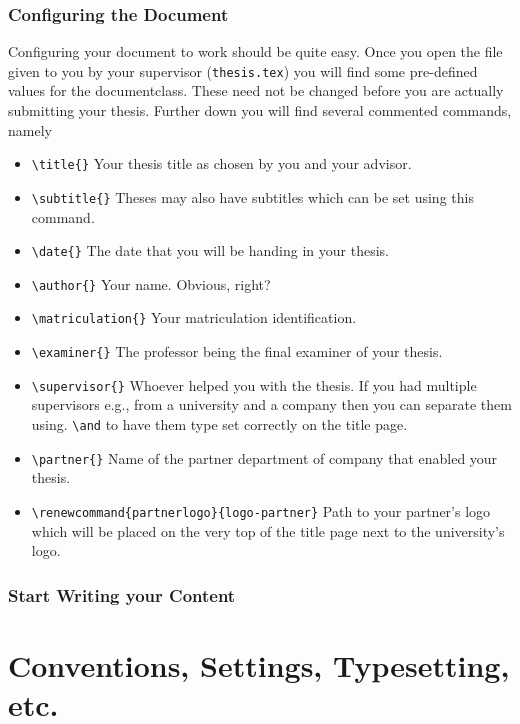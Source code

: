 \subsubsection{Configuring the Document}\label{sec:user-documentation:configure-document}

Configuring your document to work should be quite easy.
Once you open the file given to you by your supervisor (\texttt{thesis.tex}) you will find some pre-defined values for the documentclass.
These need not be changed before you are actually submitting your thesis.
Further down you will find several commented commands, namely

\begin{itemize}
    \item \texttt{\textbackslash title\{\}} Your thesis title as chosen by you and your advisor.
    \item \texttt{\textbackslash subtitle\{\}} Theses may also have subtitles which can be set using this command.
    \item \texttt{\textbackslash date\{\}} The date that you will be handing in your thesis.
    \item \texttt{\textbackslash author\{\}} Your name. Obvious, right?
    \item \texttt{\textbackslash matriculation\{\}} Your matriculation identification.
    \item \texttt{\textbackslash examiner\{\}} The professor being the final examiner of your thesis.
    \item \texttt{\textbackslash supervisor\{\}} Whoever helped you with the thesis. If you had multiple supervisors e.g., from a university and a company then you can separate them using. \texttt{\textbackslash and} to have them type set correctly on the title page.
    \item \texttt{\textbackslash partner\{\}} Name of the partner department of company that enabled your thesis.
    \item \texttt{\textbackslash renewcommand\{partnerlogo\}\{logo-partner\}} Path to your partner's logo which will be placed on the very top of the title page next to the university's logo.
\end{itemize}


\subsubsection{Start Writing your Content}\label{sec:user-documentation:writing}


\section{Conventions, Settings, Typesetting, etc.}\label{sec:user-documentation:settings}



